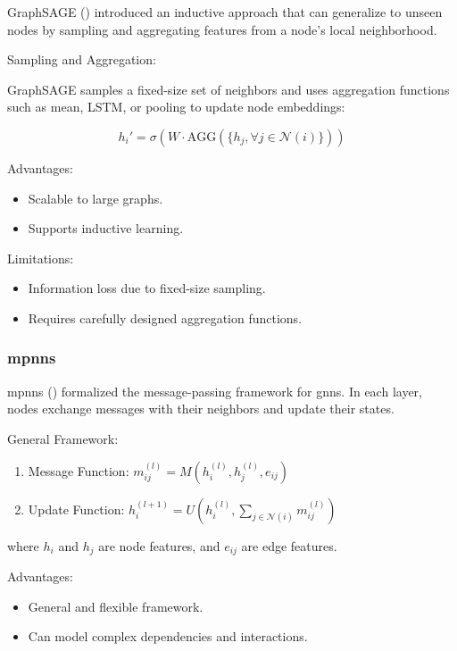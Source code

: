 GraphSAGE (\cite{Hamilton2017}) introduced an inductive approach that can generalize to unseen nodes by sampling and aggregating features from a node's local neighborhood.

Sampling and Aggregation:

GraphSAGE samples a fixed-size set of neighbors and uses aggregation functions such as mean, LSTM, or pooling to update node embeddings:

\[ h_i' = \sigma\left(W \cdot \text{AGG}\left(\{h_j, \forall j \in \mathcal{N}(i)\}\right)\right) \]

Advantages:
\begin{itemize}
    \item Scalable to large graphs.
    \item Supports inductive learning.
\end{itemize}


Limitations:
\begin{itemize}
    \item Information loss due to fixed-size sampling.
    \item Requires carefully designed aggregation functions.
\end{itemize}


\subsubsection*{\glspl{mpnn}}

\glspl{mpnn} (\cite{Gilmer2017}) formalized the message-passing framework for \glspl{gnn}. In each layer, nodes exchange messages with their neighbors and update their states.

General Framework:

\begin{enumerate}
    \item Message Function: \( m_{ij}^{(l)} = M(h_i^{(l)}, h_j^{(l)}, e_{ij}) \)
    \item Update Function: \( h_i^{(l+1)} = U\left(h_i^{(l)}, \sum_{j \in \mathcal{N}(i)} m_{ij}^{(l)}\right) \)
\end{enumerate}

where \( h_i \) and \( h_j \) are node features, and \( e_{ij} \) are edge features.

Advantages:
\begin{itemize}
    \item General and flexible framework.
    \item Can model complex dependencies and interactions.
\end{itemize}


